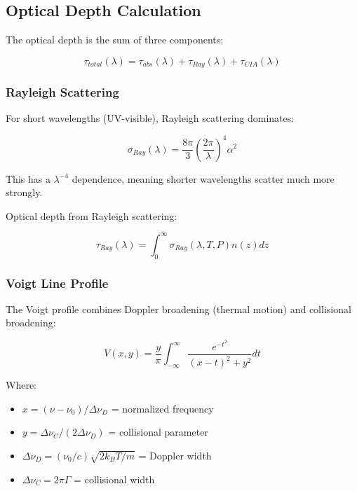 \documentclass[12pt,a4paper,oneside]{report}
\begin{document}
\subsection{Optical Depth Calculation}

The optical depth is the sum of three components:

\begin{equation}
\tau_{total}(\lambda) = \tau_{abs}(\lambda) + \tau_{Ray}(\lambda) + \tau_{CIA}(\lambda)
\label{eq:tau_total}
\end{equation}

\subsubsection{Rayleigh Scattering}

For short wavelengths (UV-visible), Rayleigh scattering dominates:

\begin{equation}
\sigma_{Ray}(\lambda) = \frac{8\pi}{3}\left(\frac{2\pi}{\lambda}\right)^4 \alpha^2
\label{eq:rayleigh}
\end{equation}

This has a $\lambda^{-4}$ dependence, meaning shorter wavelengths scatter much more strongly.

Optical depth from Rayleigh scattering:

\begin{equation}
\tau_{Ray}(\lambda) = \int_0^\infty \sigma_{Ray}(\lambda, T, P) n(z) dz
\label{eq:tau_ray}
\end{equation}

\subsubsection{Voigt Line Profile}

The Voigt profile combines Doppler broadening (thermal motion) and collisional broadening:

\begin{equation}
V(x, y) = \frac{y}{\pi} \int_{-\infty}^{\infty} \frac{e^{-t^2}}{(x-t)^2 + y^2} dt
\label{eq:voigt}
\end{equation}

Where:
\begin{itemize}
    \item $x = (\nu - \nu_0) / \Delta \nu_D$ = normalized frequency
    \item $y = \Delta \nu_C / (2 \Delta \nu_D)$ = collisional parameter
    \item $\Delta \nu_D = (\nu_0 / c) \sqrt{2k_B T / m}$ = Doppler width
    \item $\Delta \nu_C = 2\pi \Gamma$ = collisional width
\end{itemize}
\end{document}
